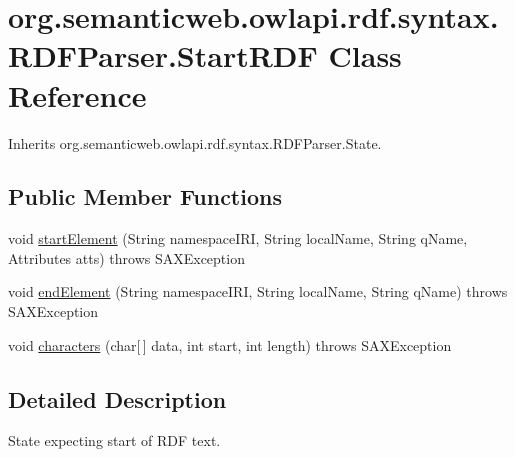 \hypertarget{classorg_1_1semanticweb_1_1owlapi_1_1rdf_1_1syntax_1_1_r_d_f_parser_1_1_start_r_d_f}{\section{org.\-semanticweb.\-owlapi.\-rdf.\-syntax.\-R\-D\-F\-Parser.\-Start\-R\-D\-F Class Reference}
\label{classorg_1_1semanticweb_1_1owlapi_1_1rdf_1_1syntax_1_1_r_d_f_parser_1_1_start_r_d_f}
}


Inherits org.\-semanticweb.\-owlapi.\-rdf.\-syntax.\-R\-D\-F\-Parser.\-State.

\subsection*{Public Member Functions}
\begin{DoxyCompactItemize}
\item 
void \hyperlink{classorg_1_1semanticweb_1_1owlapi_1_1rdf_1_1syntax_1_1_r_d_f_parser_1_1_start_r_d_f_aaefa92d56aae4e45442c65cec07f4246}{start\-Element} (String namespace\-I\-R\-I, String local\-Name, String q\-Name, Attributes atts)  throws S\-A\-X\-Exception 
\item 
void \hyperlink{classorg_1_1semanticweb_1_1owlapi_1_1rdf_1_1syntax_1_1_r_d_f_parser_1_1_start_r_d_f_a032b6f59a46e0117ae6dbe8e046c22df}{end\-Element} (String namespace\-I\-R\-I, String local\-Name, String q\-Name)  throws S\-A\-X\-Exception 
\item 
void \hyperlink{classorg_1_1semanticweb_1_1owlapi_1_1rdf_1_1syntax_1_1_r_d_f_parser_1_1_start_r_d_f_a9093d54a7a4423b8d23f4b3fd9bc5c5a}{characters} (char\mbox{[}$\,$\mbox{]} data, int start, int length)  throws S\-A\-X\-Exception 
\end{DoxyCompactItemize}


\subsection{Detailed Description}
State expecting start of R\-D\-F text. 

